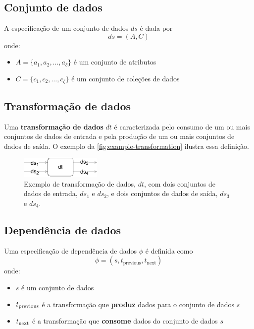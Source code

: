\subsection{Conjunto de dados}

A especificação de um conjunto de dados \( ds \) é dada por \[ ds = (A, C) \] onde:
\begin{itemize}
    \item \( A = \{a_1, a_2, \ldots, a_{\delta} \} \) é um conjunto de atributos
    \item \( C = \{c_1, c_2, \ldots, c_{\zeta} \} \) é um conjunto de coleções de dados
\end{itemize}

\subsection{Transformação de dados}


Uma \textbf{transformação de dados} \( dt \) é caracterizada pelo consumo de um ou mais conjuntos de dados de entrada e pela produção de um ou mais conjuntos de dados de saída. O exemplo da \autoref{fig:example-transformation} ilustra essa definição.

\begin{figure}[ht]
    \centering
    \includegraphics[width=0.35\textwidth]{img/example-transformation}
    \caption[Exemplo de transformação de dados]{Exemplo de transformação de dados, \( dt \), com dois conjuntos de dados de entrada, \( ds_1 \) e \( ds_2 \), e dois conjuntos de dados de saída, \( ds_3 \) e \( ds_4 \).}%
    \label{fig:example-transformation}
\end{figure}

\subsection{Dependência de dados}

Uma especificação de dependência de dados \( \phi \) é definida como \[ \phi = (s, t_{\textrm{previous}}, t_{\textrm{next}}) \] onde:
\begin{itemize}
    \item \( s \) é um conjunto de dados
    \item \( t_{\textup{previous}} \) é a transformação que {\bf produz} dados para o conjunto de dados \( s \)
    \item \( t_{\textup{next}} \) é a transformação que {\bf consome} dados do conjunto de dados \( s \)
\end{itemize}

